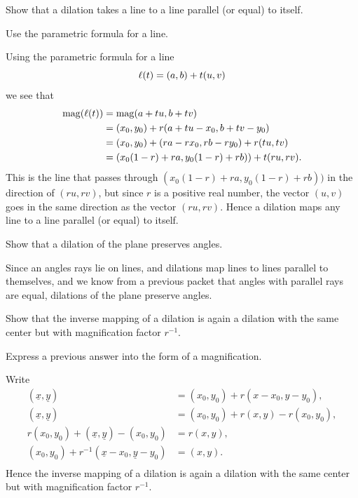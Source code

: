 \documentclass[newpage,hints,handout,12pt,noauthor,nooutcomes]{ximera}
\begin{document}
\begin{problem}
Show that a dilation takes a line to a line parallel (or equal) to
itself.
\begin{hint}
Use the parametric formula for a line.
\end{hint}
\begin{freeResponse}
Using the parametric formula for a line
\[
\ell(t) = (a,b) + t(u,v)
\]
we see that
\begin{align*}
\mathrm{mag}(\ell(t)) &=\mathrm{mag}(a+tu,b+tv)\\
&= (x_0,y_0) + r(a+tu-x_0,b+tv-y_0)\\
&= (x_0,y_0) + (ra - rx_0,rb-ry_0)+ r(tu,tv)\\
&= (x_0(1-r) + ra,y_0(1-r)+rb)) + t(ru,rv). 
\end{align*}
This is the line that passes through $(x_0(1-r) + ra,y_0(1-r)+rb))$ in
the direction of $(ru,rv)$, but since $r$ is a positive real number,
the vector $(u,v)$ goes in the same direction as the vector
$(ru,rv)$. Hence a dilation maps any line to a line parallel (or
equal) to itself.
\end{freeResponse}
\end{problem}

\begin{problem}
Show that a dilation of the plane preserves angles.
\begin{freeResponse}
Since an angles rays lie on lines, and dilations map lines to lines parallel to themselves, and we know from a previous
packet that angles with parallel rays are equal,  dilations of the plane preserve
angles.
\end{freeResponse}
\end{problem}


\begin{problem}
Show that the inverse mapping of a dilation is again a dilation with
the same center but with magnification factor $r^{-1}$.
\begin{hint}
Express a previous answer into the form of a magnification.
\end{hint}
\begin{freeResponse}
Write
\begin{align*}
(\underline{x},\underline{y}) &= (x_{0},y_{0})  +r(x-x_{0},y-y_{0}), \\
(\underline{x},\underline{y}) &= (x_{0},y_{0})  +r(x,y) -r(x_{0},y_{0}), \\
r(x_0,y_0) + (\underline{x},\underline{y}) - (x_0,y_0) &= r(x,y), \\
(x_0,y_0) + r^{-1}(\underline{x}-x_0,\underline{y}-y_0) &= (x,y). \\
\end{align*}
Hence the inverse mapping of a dilation is again a dilation with the
same center but with magnification factor $r^{-1}$.
\end{freeResponse}
\end{problem}
\end{document}
